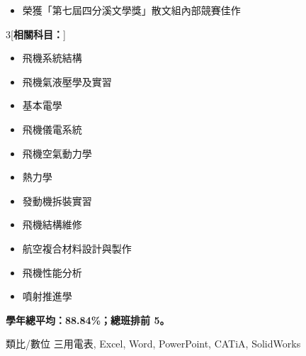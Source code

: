 \documentclass[11 pt,oneside,a4paper,titlepage]{article}
\begin{document}
{\begin{minipage}{13.1cm}
    {\begin{itemize}[label=\Large\textbullet]
        \item 榮獲「第七屆四分溪文學獎」散文組內部競賽佳作
    \end{itemize}

    \begin{multicols}{3}[\textbf{相關科目：}]
    \begin{itemize}[label=\faCaretRight]
        \item 飛機系統結構
        \item 飛機氣液壓學及實習
        \item 基本電學
        \item 飛機儀電系統
        \item 飛機空氣動力學
        \item 熱力學
        \item 發動機拆裝實習
        \item 飛機結構維修
        \item 航空複合材料設計與製作
        \item 飛機性能分析
        \item 噴射推進學
    \end{itemize}
    \end{multicols}
    \textbf{學年總平均：88.84\%；總班排前 5。}}
    { 類比/數位 \space 三用電表, Excel, Word, PowerPoint, CATiA, SolidWorks}
\end{minipage}} %
\newpage

\end{document}
